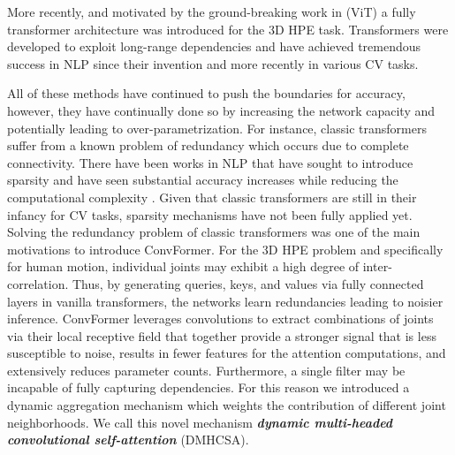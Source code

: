 \documentclass{article}
\begin{document}
More recently, and motivated by the ground-breaking work in \cite{KDWHUBMDHGUZ21} (ViT) a fully transformer architecture was introduced for the 3D HPE task. Transformers were developed to exploit long-range dependencies and have achieved tremendous success in NLP since their invention \cite{VSPUJGKP17} and more recently in various CV tasks. 


All of these methods have continued to push the boundaries for accuracy, however, they have continually done so by increasing the network capacity \cite{PA21,CJHR21,YCWYSJTFY21,HMMFA21} and potentially leading to over-parametrization. For instance, classic transformers suffer from a known problem of redundancy which occurs due to complete connectivity. There have been works in NLP that have sought to introduce sparsity and have seen substantial accuracy increases while reducing the computational complexity \cite{WLLLH20,kitaev2020reformer,Jaszczur2021SparseIE}. Given that classic transformers are still in their infancy for CV tasks, sparsity mechanisms have not been fully applied yet. Solving the redundancy problem of classic transformers was one of the main motivations to introduce ConvFormer. For the 3D HPE problem and specifically for human motion, individual joints may exhibit a high degree of inter-correlation. Thus, by generating queries, keys, and values via fully connected layers in vanilla transformers, the networks learn redundancies leading to noisier inference. ConvFormer leverages convolutions to extract combinations of joints via their local receptive field that together provide a stronger signal that is less susceptible to noise, results in fewer features for the attention computations, and extensively reduces parameter counts. Furthermore, a single filter may be incapable of fully capturing dependencies. For this reason we introduced a dynamic aggregation mechanism which weights the contribution of different joint neighborhoods. We call this novel mechanism \textbf{\textit{dynamic multi-headed convolutional self-attention}} (DMHCSA).
\end{document}
